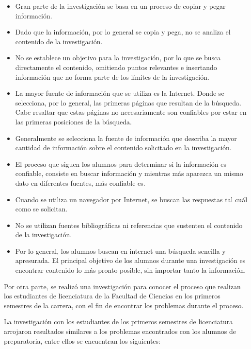 \begin{itemize}
  \item Gran parte de la investigación se basa en un proceso de copiar y pegar información.
  \item Dado que la información, por lo general se copia y pega, no se analiza el contenido de la investigación.
  \item No se establece un objetivo para la investigación, por lo que se busca directamente el contenido, omitiendo puntos relevantes e insertando información que no forma parte de los límites de la investigación.
  \item La mayor fuente de información que se utiliza es la Internet. Donde se selecciona, por lo general, las primeras páginas que resultan de la búsqueda. Cabe resaltar que estas páginas no necesariamente son confiables por estar en las primeras posiciones de la búsqueda.
  \item Generalmente se selecciona la fuente de información que describa la mayor cantidad de información sobre el contenido solicitado en la investigación.
  \item El proceso que siguen los alumnos para determinar si la información es confiable, consiste en buscar información y mientras más aparezca un mismo dato en diferentes fuentes, más confiable es.
  \item Cuando se utiliza un navegador por Internet, se buscan las respuestas tal cuál como se solicitan.
  \item No se utilizan fuentes bibliográficas ni referencias que sustenten el contenido de la investigación.
  \item Por lo general, los alumnos buscan en internet una búsqueda sencilla y apresurada. El principal objetivo de los alumnos durante una investigación es encontrar contenido lo más pronto posible, sin importar tanto la información.
\end{itemize}

Por otra parte, se realizó una investigación para conocer el proceso que realizan los estudiantes de licenciatura de la Facultad de Ciencias en los primeros semestres de la carrera, con el fin de encontrar los problemas durante el proceso.

La investigación con los estudiantes de los primeros semestres de licenciatura arrojaron resultados similares a los problemas encontrados con los alumnos de preparatoria, entre ellos se encuentran los siguientes:

